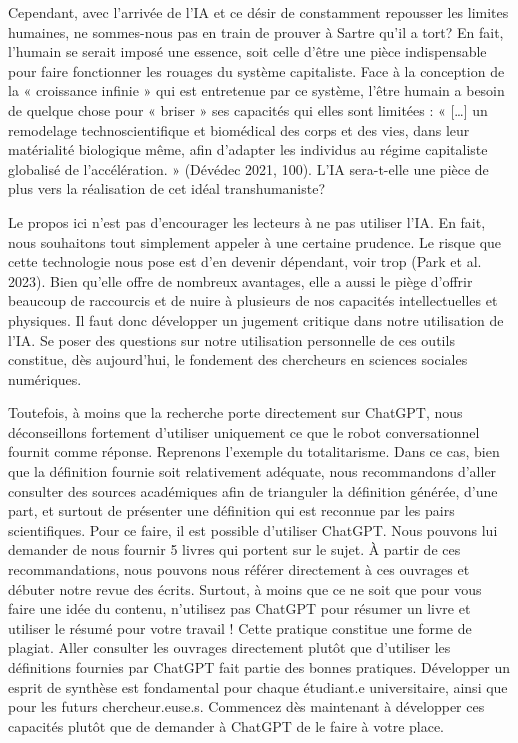 \documentclass[
  letterpaper,
]{scrbook}
\begin{document}
Cependant, avec l'arrivée de l'IA et ce désir de constamment repousser
les limites humaines, ne sommes-nous pas en train de prouver à Sartre
qu'il a tort? En fait, l'humain se serait imposé une essence, soit celle
d'être une pièce indispensable pour faire fonctionner les rouages du
système capitaliste. Face à la conception de la « croissance infinie »
qui est entretenue par ce système, l'être humain a besoin de quelque
chose pour « briser » ses capacités qui elles sont limitées : «
{[}\ldots{]} un remodelage technoscientifique et biomédical des corps et
des vies, dans leur matérialité biologique même, afin d'adapter les
individus au régime capitaliste globalisé de l'accélération. » (Dévédec
2021, 100). L'IA sera-t-elle une pièce de plus vers la réalisation de
cet idéal transhumaniste?

Le propos ici n'est pas d'encourager les lecteurs à ne pas utiliser
l'IA. En fait, nous souhaitons tout simplement appeler à une certaine
prudence. Le risque que cette technologie nous pose est d'en devenir
dépendant, voir trop (Park et al. 2023). Bien qu'elle offre de nombreux
avantages, elle a aussi le piège d'offrir beaucoup de raccourcis et de
nuire à plusieurs de nos capacités intellectuelles et physiques. Il faut
donc développer un jugement critique dans notre utilisation de l'IA. Se
poser des questions sur notre utilisation personnelle de ces outils
constitue, dès aujourd'hui, le fondement des chercheurs en sciences
sociales numériques.

Toutefois, à moins que la recherche porte directement sur ChatGPT, nous
déconseillons fortement d'utiliser uniquement ce que le robot
conversationnel fournit comme réponse. Reprenons l'exemple du
totalitarisme. Dans ce cas, bien que la définition fournie soit
relativement adéquate, nous recommandons d'aller consulter des sources
académiques afin de trianguler la définition générée, d'une part, et
surtout de présenter une définition qui est reconnue par les pairs
scientifiques. Pour ce faire, il est possible d'utiliser ChatGPT. Nous
pouvons lui demander de nous fournir 5 livres qui portent sur le sujet.
À partir de ces recommandations, nous pouvons nous référer directement à
ces ouvrages et débuter notre revue des écrits. Surtout, à moins que ce
ne soit que pour vous faire une idée du contenu, n'utilisez pas ChatGPT
pour résumer un livre et utiliser le résumé pour votre travail ! Cette
pratique constitue une forme de plagiat. Aller consulter les ouvrages
directement plutôt que d'utiliser les définitions fournies par ChatGPT
fait partie des bonnes pratiques. Développer un esprit de synthèse est
fondamental pour chaque étudiant.e universitaire, ainsi que pour les
futurs chercheur.euse.s. Commencez dès maintenant à développer ces
capacités plutôt que de demander à ChatGPT de le faire à votre place.
\end{document}
